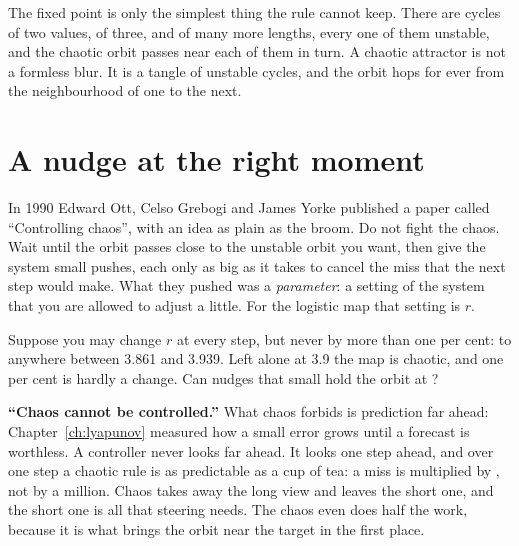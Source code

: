 The fixed point is only the simplest thing the rule cannot keep. There are
cycles of two values, of three, and of many more lengths, every one of them
unstable, and the chaotic orbit passes near each of them in turn. A chaotic
attractor is not a formless blur. It is a tangle of unstable cycles, and the
orbit hops for ever from the neighbourhood of one to the next.

\section{A nudge at the right moment}
\label{sec:ch17-nudge}

\noindent
In 1990 Edward Ott, Celso Grebogi and James Yorke published a paper called
\enquote{Controlling chaos}, with an idea as plain as the broom. Do not fight
the chaos. Wait until the orbit passes close to the unstable orbit you want,
then give the system small pushes, each only as big as it takes to cancel
the miss that the next step would make. What they pushed was a
\emph{parameter}: a setting of the system that you are allowed to adjust a
little. For the logistic map that setting is $r$.

\begin{think}
Suppose you may change $r$ at every step, but never by more than one per
cent: to anywhere between \num{3.861} and \num{3.939}. Left alone at
\num{3.9} the map is chaotic, and one per cent is hardly a change. Can
nudges that small hold the orbit at ?
\end{think}

\begin{trapbox}
\textbf{\enquote{Chaos cannot be controlled.}} What chaos forbids is
prediction far ahead: Chapter~\ref{ch:lyapunov} measured how a small error
grows until a forecast is worthless. A controller never looks far ahead. It
looks one step ahead, and over one step a chaotic rule is as predictable as a
cup of tea: a miss is multiplied by , not by a million.
Chaos takes away the long view and leaves the short one, and the short one is
all that steering needs. The chaos even does half the work, because it is
what brings the orbit near the target in the first place.
\end{trapbox}

